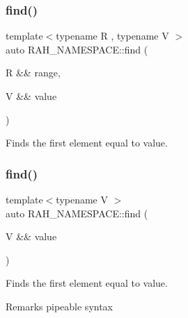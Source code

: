 \subsubsection{\texorpdfstring{find()}{find()}\hspace{0.1cm}{\footnotesize\ttfamily [1/2]}}
{\footnotesize\ttfamily template$<$typename R , typename V $>$ \\
auto R\+A\+H\+\_\+\+N\+A\+M\+E\+S\+P\+A\+C\+E\+::find (\begin{DoxyParamCaption}\item[{R \&\&}]{range,  }\item[{V \&\&}]{value }\end{DoxyParamCaption})}



Finds the first element equal to value. 


\begin{DoxyCodeInclude}{0}
\DoxyCodeLine{        );}
\end{DoxyCodeInclude}
\mbox{\label{namespace_r_a_h___n_a_m_e_s_p_a_c_e_a95fc53c7921b52d24f79ac55711673b3}} 
\subsubsection{\texorpdfstring{find()}{find()}\hspace{0.1cm}{\footnotesize\ttfamily [2/2]}}
{\footnotesize\ttfamily template$<$typename V $>$ \\
auto R\+A\+H\+\_\+\+N\+A\+M\+E\+S\+P\+A\+C\+E\+::find (\begin{DoxyParamCaption}\item[{V \&\&}]{value }\end{DoxyParamCaption})}



Finds the first element equal to value. 

\begin{DoxyRemark}{Remarks}
pipeable syntax
\end{DoxyRemark}

